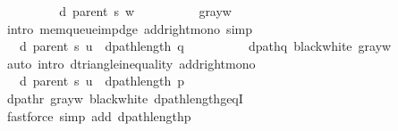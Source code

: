 \begin{isabellebody}
\ \ \ \ \isamarkupfalse%
\ \isamarkupfalse%
\ {\isachardoublequoteopen}{\isachardot}{\kern0pt}{\isachardot}{\kern0pt}{\isachardot}{\kern0pt}\ {\isasymle}\ d\ {\isacharparenleft}{\kern0pt}parent\ s{\isacharparenright}{\kern0pt}\ w\ {\isacharplus}{\kern0pt}\ {}{\isachardoublequoteclose}\isanewline
\ \ \ \ \ \ \isamarkupfalse%
\ gray{\isacharunderscore}{\kern0pt}w\isanewline
\ \ \ \ \ \ \isamarkupfalse%
\ {\isacharparenleft}{\kern0pt}intro\ mem{\isacharunderscore}{\kern0pt}queue{\isacharunderscore}{\kern0pt}imp{\isacharunderscore}{\kern0pt}d{\isacharunderscore}{\kern0pt}ge\ add{\isacharunderscore}{\kern0pt}right{\isacharunderscore}{\kern0pt}mono{\isacharparenright}{\kern0pt}\ simp\isanewline
\ \ \ \ \isamarkupfalse%
\ \isamarkupfalse%
\ {\isachardoublequoteopen}{\isachardot}{\kern0pt}{\isachardot}{\kern0pt}{\isachardot}{\kern0pt}\ {\isasymle}\ d\ {\isacharparenleft}{\kern0pt}parent\ s{\isacharparenright}{\kern0pt}\ u\ {\isacharplus}{\kern0pt}\ dpath{\isacharunderscore}{\kern0pt}length\ q\ {\isacharplus}{\kern0pt}\ {}{\isachardoublequoteclose}\isanewline
\ \ \ \ \ \ \isamarkupfalse%
\ dpath{\isacharunderscore}{\kern0pt}q\ black{\isacharunderscore}{\kern0pt}white\ gray{\isacharunderscore}{\kern0pt}w\isanewline
\ \ \ \ \ \ \isamarkupfalse%
\ {\isacharparenleft}{\kern0pt}auto\ intro{\isacharcolon}{\kern0pt}\ d{\isacharunderscore}{\kern0pt}triangle{\isacharunderscore}{\kern0pt}inequality\ add{\isacharunderscore}{\kern0pt}right{\isacharunderscore}{\kern0pt}mono{\isacharparenright}{\kern0pt}\isanewline
\ \ \ \ \isamarkupfalse%
\ \isamarkupfalse%
\ {\isachardoublequoteopen}{\isachardot}{\kern0pt}{\isachardot}{\kern0pt}{\isachardot}{\kern0pt}\ {\isasymle}\ d\ {\isacharparenleft}{\kern0pt}parent\ s{\isacharparenright}{\kern0pt}\ u\ {\isacharplus}{\kern0pt}\ dpath{\isacharunderscore}{\kern0pt}length\ p{\isachardoublequoteclose}\isanewline
\ \ \ \ \ \ \isamarkupfalse%
\ dpath{\isacharunderscore}{\kern0pt}r\ gray{\isacharunderscore}{\kern0pt}w\ black{\isacharunderscore}{\kern0pt}white\ dpath{\isacharunderscore}{\kern0pt}length{\isacharunderscore}{\kern0pt}geq{\isacharunderscore}{\kern0pt}{}I\isanewline
\ \ \ \ \ \ \isamarkupfalse%
\ {\isacharparenleft}{\kern0pt}fastforce\ simp\ add{\isacharcolon}{\kern0pt}\ dpath{\isacharunderscore}{\kern0pt}length{\isacharunderscore}{\kern0pt}p{\isacharparenright}{\kern0pt}\isanewline
\ \ \ \ \isamarkupfalse%

\end{isabellebody}
